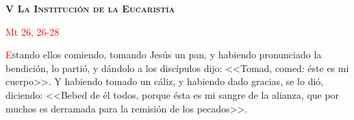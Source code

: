 \begin{center}
    \textbf{\textsc{V La Institución de la Eucaristía}}

    \textcolor{red}{Mt 26, 26-28}
\end{center}

\lettrine[lines=2]{\textcolor{red}{E}}stando ellos comiendo, tomando Jesús un pan, y habiendo pronunciado la bendición, lo partió, y dándolo a los discípulos dijo: <<Tomad, comed: éste es mi cuerpo>>.
Y habiendo tomado un cáliz, y habiendo dado gracias, se lo dió, diciendo: <<Bebed de él todos, porque ésta es mi sangre de la alianza, que por muchos es derramada para la remisión de los pecados>>.